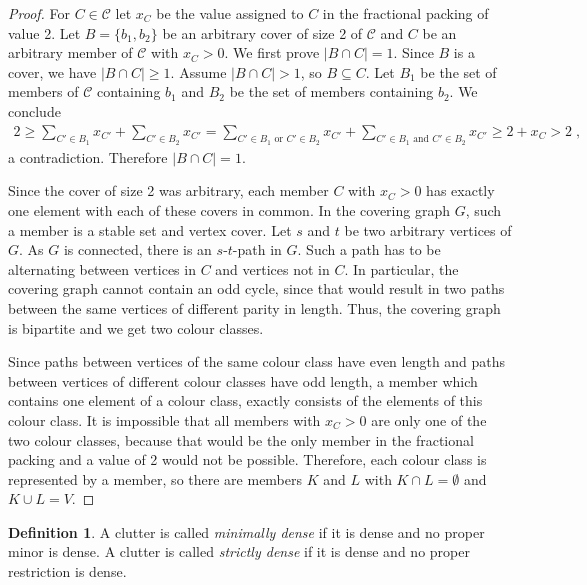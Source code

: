 \documentclass[a4paper, 12pt]{scrbook}
\theoremstyle{definition}
\newtheorem*{definition}{Definition}
\begin{document}
   \begin{proof}
       For $C \in \mathcal{C}$ let $x_C$ be the value assigned to $C$ in the fractional packing of value 2.
       Let $B=\{b_1,b_2\}$ be an arbitrary cover of size 2 of $\mathcal{C}$ and $C$ be an arbitrary member of $\mathcal{C}$ with $x_{C} > 0$.
       We first prove $|B\cap C| = 1$.
       Since $B$ is a cover, we have $|B\cap C| \geq 1$.
       Assume $|B \cap C| > 1$, so $B \subseteq C$.
       Let $B_1$ be the set of members of $\mathcal{C}$ containing $b_1$ and $B_2$ be the set of members containing $b_2$.
       We conclude
       \begin{align*}
           2 \geq \sum_{C'\in B_1} x_{C'} + \sum_{C' \in B_2} x_{C'} = \sum_{C' \in B_1 \text{ or } C' \in B_2} x_{C'} + \sum_{C' \in B_1 \text{ and } C' \in B_2} x_{C'} \geq 2 + x_C > 2 \;,
       \end{align*}
       a contradiction. Therefore $|B\cap C| = 1$.

       Since the cover of size 2 was arbitrary, each member $C$ with $x_C>0$ has exactly one element with each of these covers in common.
       In the covering graph $G$, such a member is a stable set and vertex cover.
       Let $s$ and $t$ be two arbitrary vertices of $G$.
       As $G$ is connected, there is an $s$-$t$-path in $G$.
       Such a path has to be alternating between vertices in $C$ and vertices not in $C$.
       In particular, the covering graph cannot contain an odd cycle, since that would result in two paths between the same vertices of different parity in length. Thus, the covering graph is bipartite and we get two colour classes.

       Since paths between vertices of the same colour class have even length and paths between vertices of different colour classes have odd length, a member which contains one element of a colour class, exactly consists of the elements of this colour class.
       It is impossible that all members with $x_C > 0$ are only one of the two colour classes, because that would be the only member in the fractional packing and a value of 2 would not be possible.
       Therefore, each colour class is represented by a member, so there are members $K$ and $L$ with $K \cap L = \emptyset$ and $K \cup L = V$.
   \end{proof}

   \begin{definition}
       A clutter is called \emph{minimally dense} if it is dense and no proper minor is dense.
       A clutter is called \emph{strictly dense} if it is dense and no proper restriction is dense.
   \end{definition}
\end{document}
